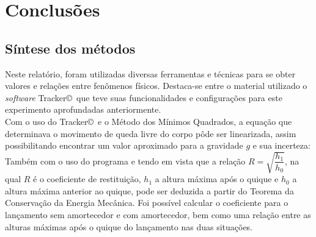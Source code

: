\documentclass[a4paper, 12pt]{article}
\begin{document}
	\newpage	
	\section{Conclusões}
		\subsection{Síntese dos métodos}
		Neste relatório, foram utilizadas diversas ferramentas e técnicas para se obter valores e relações entre fenômenos físicos. Destaca-se entre o material utilizado o \textsl{software} Tracker\copyright \, que teve suas funcionalidades e configurações para este experimento aprofundadas anteriormente. \\
		Com o uso do Tracker\copyright \,  e o Método dos Mínimos Quadrados, a equação que determinava o movimento de queda livre do corpo pôde ser linearizada, assim possibilitando encontrar um valor aproximado para a gravidade $g$ e sua incerteza:
		Também com o uso do programa e tendo em vista que a relação $R= \sqrt{\dfrac{h_1}{h_0}}$, na qual $R$ é o coeficiente de restituição, $h_1$ a altura máxima após o quique e $h_0$
a altura máxima anterior ao quique, pode ser deduzida a partir do Teorema da Conservação da Energia Mecânica. Foi possível calcular o coeficiente para o lançamento sem amortecedor e com amortecedor, bem como uma relação entre as alturas máximas após o quique do lançamento nas duas situações.
\end{document}
